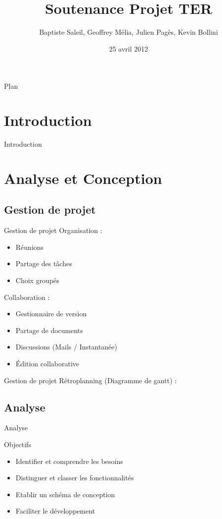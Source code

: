 \documentclass{beamer}
\title{Soutenance Projet TER}
\author{Baptiste Saleil, Geoffrey Mélia, Julien Pagès, Kevin Bollini}
\date{25 avril 2012}
\begin{document}
	\begin{frame}
		\titlepage
	\end{frame}

	\begin{frame}{Plan}
		\tableofcontents
	\end{frame}

	\section{Introduction}
		\begin{frame}{Introduction}
				
		\end{frame}

		
	\section{Analyse et Conception}
	\subsection{Gestion de projet}
		\begin{frame}{Gestion de projet}
		Organisation :
			\begin{itemize}
				\item{Réunions}
				\item{Partage des tâches}
				\item{Choix groupés}
			\end{itemize}
			Collaboration :
			\begin{itemize}
				\item{Gestionnaire de version}
				\item{Partage de documents}
				\item{Discussions (Mails / Instantanée)}
				\item{Édition collaborative}
			\end{itemize}
		\end{frame}
		
		\begin{frame}{Gestion de projet}
		Rétroplanning (Diagramme de gantt) :
		\begin{center}
			
		\end{center}
		\end{frame}
	
	\subsection{Analyse}
		\begin{frame}{Analyse}
				\begin{exampleblock}{Objectifs}
				\begin{itemize}
					\item{Identifier et comprendre les besoins}
					\item{Distinguer et classer les fonctionnalités}
					\item{Etablir un schéma de conception}
					\item{Faciliter le développement}
				\end{itemize}
				\end{exampleblock}
		\end{frame}
	
\end{document}
